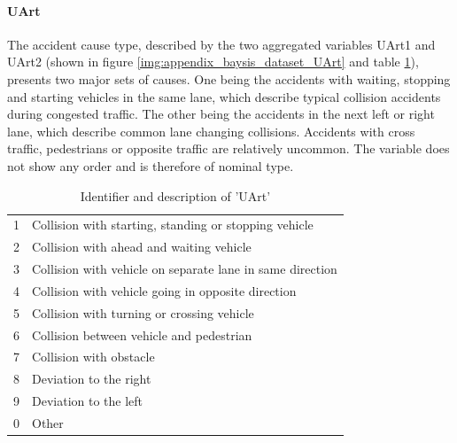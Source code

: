 \documentclass[a4paper,headsepline,footsepline,fontsize=11pt,BCOR=12mm,DIV=12]{report}
\begin{document}

\paragraph{UArt}
The accident cause type, described by the two aggregated variables UArt1 and UArt2 (shown in figure \ref{img:appendix_baysis_dataset_UArt} and table \ref{table:baysis_dataset_UArt}), presents two major sets of causes. One being the accidents with waiting, stopping and starting vehicles in the same lane, which describe typical collision accidents during congested traffic. The other being the accidents in the next left or right lane, which describe common lane changing collisions. Accidents with cross traffic, pedestrians or opposite traffic are relatively uncommon. The variable does not show any order and is therefore of nominal type.
\noindent
\begin{table}[h!]
	\centering
	\begin{tabular}{c|l}  
 		1 & Collision with starting, standing or stopping vehicle  \\ 
 		2 & Collision with ahead and waiting vehicle  \\
 		3 & Collision with vehicle on separate lane in same direction  \\
 		4 & Collision with vehicle going in opposite direction  \\
 		5 & Collision with turning or crossing vehicle  \\
 		6 & Collision between vehicle and pedestrian  \\
 		7 & Collision with obstacle  \\
 		8 & Deviation to the right  \\
 		9 & Deviation to the left  \\
 		0 & Other  \\
	\end{tabular}
	\caption{Identifier and description of 'UArt'}
	\label{table:baysis_dataset_UArt}
\end{table}
\end{document}

